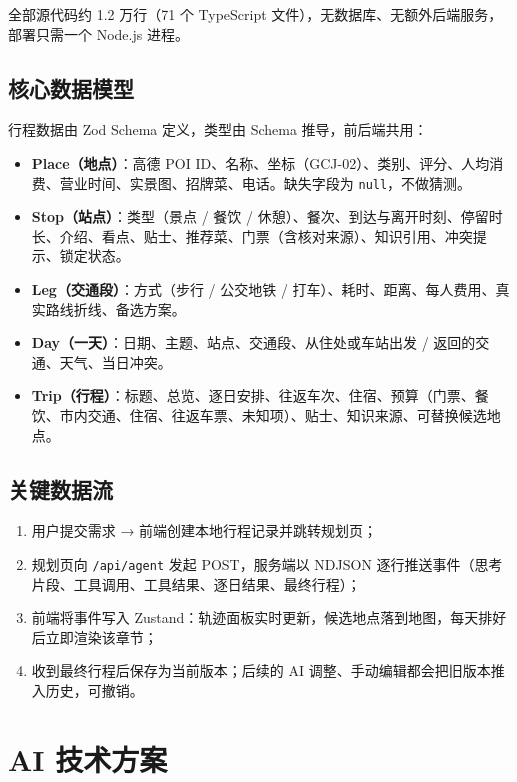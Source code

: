 \documentclass[a4paper]{article}
\def\labelenumi{\arabic{enumi}.}
\begin{document}
全部源代码约 1.2 万行（71 个 TypeScript 文件），无数据库、无额外后端服务，部署只需一个 Node.js 进程。

\subsection{核心数据模型}

行程数据由 Zod Schema 定义，类型由 Schema 推导，前后端共用：

\begin{itemize}
\item
  \textbf{Place（地点）}：高德 POI ID、名称、坐标（GCJ-02）、类别、评分、人均消费、营业时间、实景图、招牌菜、电话。缺失字段为 \texttt{null}，不做猜测。
\item
  \textbf{Stop（站点）}：类型（景点 / 餐饮 / 休憩）、餐次、到达与离开时刻、停留时长、介绍、看点、贴士、推荐菜、门票（含核对来源）、知识引用、冲突提示、锁定状态。
\item
  \textbf{Leg（交通段）}：方式（步行 / 公交地铁 / 打车）、耗时、距离、每人费用、真实路线折线、备选方案。
\item
  \textbf{Day（一天）}：日期、主题、站点、交通段、从住处或车站出发 / 返回的交通、天气、当日冲突。
\item
  \textbf{Trip（行程）}：标题、总览、逐日安排、往返车次、住宿、预算（门票、餐饮、市内交通、住宿、往返车票、未知项）、贴士、知识来源、可替换候选地点。
\end{itemize}

\subsection{关键数据流}

\begin{enumerate}
\def\labelenumi{\arabic{enumi}.}
\item
  用户提交需求 → 前端创建本地行程记录并跳转规划页；
\item
  规划页向 \texttt{/api/agent} 发起 POST，服务端以 NDJSON 逐行推送事件（思考片段、工具调用、工具结果、逐日结果、最终行程）；
\item
  前端将事件写入 Zustand：轨迹面板实时更新，候选地点落到地图，每天排好后立即渲染该章节；
\item
  收到最终行程后保存为当前版本；后续的 AI 调整、手动编辑都会把旧版本推入历史，可撤销。
\end{enumerate}

\section{AI 技术方案}
\end{document}
